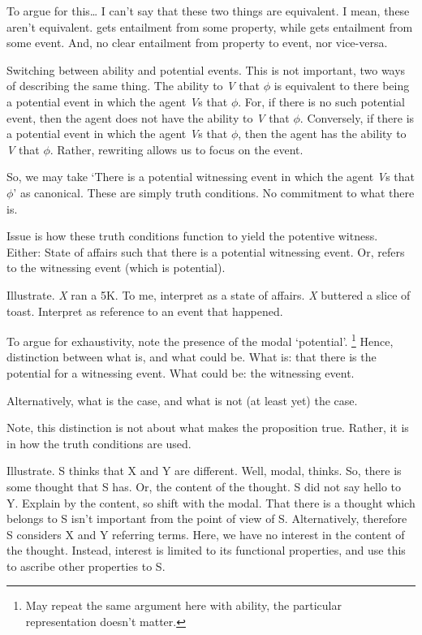 \begin{note}
  {
    \color{red}
    To argue for this\dots
    I can't say that these two things are equivalent.
    I mean, these aren't equivalent.
    \AR{} gets entailment from some property, while \WR{} gets entailment from some event.
    And, no clear entailment from property to event, nor vice-versa.
  }

  Switching between ability and potential events.
  This is not important, two ways of describing the same thing.
  The ability to \emph{V} that \(\phi\) is equivalent to there being a potential event in which the agent \emph{V}s that \(\phi\).
  For, if there is no such potential event, then the agent does not have the ability to \emph{V} that \(\phi\).
  Conversely, if there is a potential event in which the agent \emph{V}s that \(\phi\), then the agent has the ability to \emph{V} that \(\phi\).
  Rather, rewriting allows us to focus on the event.

  So, we may take `There is a potential witnessing event in which the agent \emph{V}s that \(\phi\)' as canonical.
  These are simply truth conditions.
  No commitment to what there is.

  Issue is how these truth conditions function to yield the potentive witness.
  Either:
  State of affairs such that there is a potential witnessing event.
  Or, refers to the witnessing event (which is potential).

  Illustrate.
  \emph{X} ran a 5K.
  To me, interpret as a state of affairs.
  \emph{X} buttered a slice of toast.
  Interpret as reference to an event that happened.

  To argue for exhaustivity, note the presence of the modal `potential'.\nolinebreak
  \footnote{
    May repeat the same argument here with ability, the particular representation doesn't matter.
  }
  Hence, distinction between what is, and what could be.
  What is: that there is the potential for a witnessing event.
  What could be: the witnessing event.

  Alternatively, what is the case, and what is not (at least yet) the case.

  Note, this distinction is not about what makes the proposition true.
  Rather, it is in how the truth conditions are used.

  Illustrate.
  S thinks that X and Y are different.
  Well, modal, thinks.
  So, there is some thought that S has.
  Or, the content of the thought.
  S did not say hello to Y.
  Explain by the content, so shift with the modal.
  That there is a thought which belongs to S isn't important from the point of view of S.
  Alternatively, therefore S considers X and Y referring terms.
  Here, we have no interest in the content of the thought.
  Instead, interest is limited to its functional properties, and use this to ascribe other properties to S.


\end{note}
